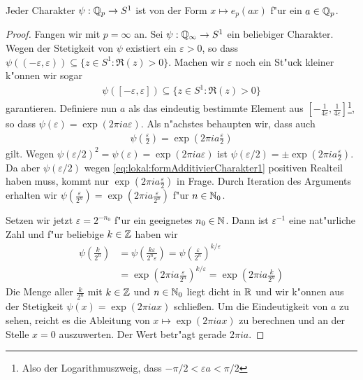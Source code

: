 		\begin{lemma}
			Jeder Charakter $\psi: {\mathbb{Q}_p} \to S^1$ ist von der Form $x \mapsto e_p(ax)$ f"ur ein $a \in {\mathbb{Q}_p}$.
		\end{lemma}
		\begin{proof}
			Fangen wir mit $p=\infty$ an. Sei $\psi: \mathbb{Q}_\infty \to S^1$ ein beliebiger Charakter.
			Wegen der Stetigkeit von $\psi$ existiert ein $\varepsilon > 0$, so dass $\psi((-\varepsilon, \varepsilon)) \subseteq \{z\in S^1: \Re(z)>0\}$.
			Machen wir $\varepsilon$ noch ein St"uck kleiner k"onnen wir sogar 
			\begin{align}\label{eq:lokal:formAdditivierCharakter1}
				\psi([-\varepsilon, \varepsilon]) \subseteq \{z\in S^1: \Re(z)>0\}
			\end{align}
			garantieren.
			Definiere nun $a$ als das eindeutig bestimmte Element aus $[-\frac{1}{4\varepsilon},\frac{1}{4\varepsilon}]$\footnote{Also der Logarithmuszweig, dass $-\pi/2<\varepsilon a<\pi/2$}, so dass $\psi (\varepsilon) = \exp(2\pi i a \varepsilon)$.
			Als n"achstes behaupten wir, dass auch
			\begin{align*}
				\psi \left(\frac{\varepsilon}{2}\right) =  \exp\left(2\pi i  a \frac{\varepsilon}{2}\right)
			\end{align*}
			gilt.
			Wegen $\psi (\varepsilon/2)^2 = \psi (\varepsilon) = \exp(2\pi i a \varepsilon)$ ist $\psi (\varepsilon/2) = \pm \exp(2\pi i  a \frac{\varepsilon}{2})$.
			Da aber $\psi(\varepsilon/2)$ wegen \eqref{eq:lokal:formAdditivierCharakter1} positiven Realteil haben muss, kommt nur $ \exp(2\pi i  a \frac{\varepsilon}{2})$ in Frage.
			Durch Iteration des Arguments erhalten wir $\psi \left(\frac{\varepsilon}{2^n}\right) = \exp(2\pi i  a \frac{\varepsilon}{2^n})$ f"ur $n\in \mathbb{N}_0$.
			
			Setzen wir jetzt $\varepsilon = 2^{-n_0}$ f"ur ein geeignetes  $n_0\in\mathbb{N}$.
			Dann ist $\varepsilon^{-1}$ eine nat"urliche Zahl und f"ur beliebige $k\in\mathbb{Z}$ haben wir
			\begin{align*}
				\psi \left(\frac{k} {2^{n}}\right) &= \psi \left(\frac{k\varepsilon} {2^{n}\varepsilon}\right) 
										= \psi \left(\frac{\varepsilon} {2^{n}}\right) ^{k/\varepsilon} 
										\\&= \exp\left(2\pi i  a \frac{\varepsilon}{2^n}\right)^{k/\varepsilon}%
										= \exp\left(2\pi i  a \frac{k}{2^n}\right)
			\end{align*}
			Die Menge aller $\frac{k}{2^n}$ mit $k\in \mathbb{Z}$ und $n\in \mathbb{N}_0$ liegt dicht in $\mathbb{R}$ und wir k"onnen aus der Stetigkeit $\psi(x) = \exp(2\pi i a x)$ schließen.
			Um die Eindeutigkeit von $a$ zu sehen, reicht es die Ableitung  von $x \mapsto \exp(2\pi i a x)$ zu berechnen und an der Stelle $x=0$ auszuwerten.
			Der Wert betr"agt gerade $2\pi i a$.
			

\end{proof}
